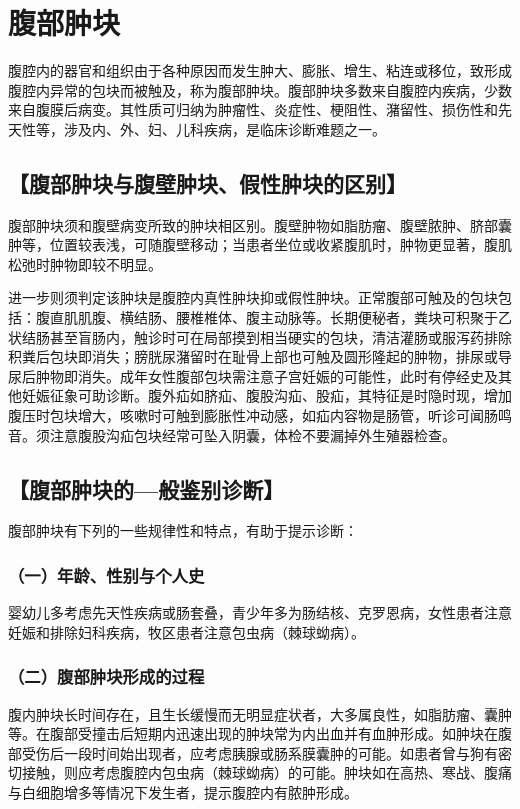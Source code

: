 \chapter{腹部肿块}

腹腔内的器官和组织由于各种原因而发生肿大、膨胀、增生、粘连或移位，致形成腹腔内异常的包块而被触及，称为腹部肿块。腹部肿块多数来自腹腔内疾病，少数来自腹膜后病变。其性质可归纳为肿瘤性、炎症性、梗阻性、潴留性、损伤性和先天性等，涉及内、外、妇、儿科疾病，是临床诊断难题之一。

\section{【腹部肿块与腹壁肿块、假性肿块的区别】}

腹部肿块须和腹壁病变所致的肿块相区别。腹壁肿物如脂肪瘤、腹壁脓肿、脐部囊肿等，位置较表浅，可随腹壁移动；当患者坐位或收紧腹肌时，肿物更显著，腹肌松弛时肿物即较不明显。

进一步则须判定该肿块是腹腔内真性肿块抑或假性肿块。正常腹部可触及的包块包括：腹直肌肌腹、横结肠、腰椎椎体、腹主动脉等。长期便秘者，粪块可积聚于乙状结肠甚至盲肠内，触诊时可在局部摸到相当硬实的包块，清洁灌肠或服泻药排除积粪后包块即消失；膀胱尿潴留时在耻骨上部也可触及圆形隆起的肿物，排尿或导尿后肿物即消失。成年女性腹部包块需注意子宫妊娠的可能性，此时有停经史及其他妊娠征象可助诊断。腹外疝如脐疝、腹股沟疝、股疝，其特征是时隐时现，增加腹压时包块增大，咳嗽时可触到膨胀性冲动感，如疝内容物是肠管，听诊可闻肠鸣音。须注意腹股沟疝包块经常可坠入阴囊，体检不要漏掉外生殖器检查。

\section{【腹部肿块的---般鉴别诊断】}

腹部肿块有下列的一些规律性和特点，有助于提示诊断：

\subsection{（一）年龄、性别与个人史}

婴幼儿多考虑先天性疾病或肠套叠，青少年多为肠结核、克罗恩病，女性患者注意妊娠和排除妇科疾病，牧区患者注意包虫病（棘球蚴病）。

\subsection{（二）腹部肿块形成的过程}

腹内肿块长时间存在，且生长缓慢而无明显症状者，大多属良性，如脂肪瘤、囊肿等。在腹部受撞击后短期内迅速出现的肿块常为内出血并有血肿形成。如肿块在腹部受伤后一段时间始出现者，应考虑胰腺或肠系膜囊肿的可能。如患者曾与狗有密切接触，则应考虑腹腔内包虫病（棘球蚴病）的可能。肿块如在高热、寒战、腹痛与白细胞增多等情况下发生者，提示腹腔内有脓肿形成。

